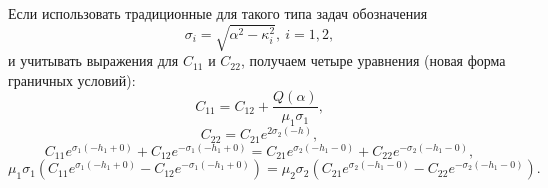 \documentclass[a4paper, 12pt]{article}
\newcommand{\s}[1]{\sigma_{#1}}
\newcommand{\m}[1]{\mu_{#1}}
\newcommand{\E}[2]{e^{#1 #2}}
\begin{document}
Если использовать традиционные для такого типа задач обозначения
$$\sigma_i=\sqrt{\alpha^2-\kappa_i^2},\ i=1, 2,$$
и учитывать выражения для $C_{11}$ и $C_{22}$, получаем четыре уравнения (новая форма граничных условий):
\begin{equation}
    C_{11}=C_{12}+\frac{Q(\alpha)}{\m{1} \s{1}},
\end{equation}
\begin{equation}
    C_{22}=C_{21} \E{2\s{2}}{(-h)},
\end{equation}
\begin{equation}
    C_{11} \E{\s{1}}{(-h_1+0)}+ C_{12} \E{-\s{1}}{(-h_1+0)}=C_{21} \E{\s{2}}{(-h_1-0)}+ C_{22} \E{-\s{2}}{(-h_1-0)},
\end{equation}
\begin{equation}
    \m{1}\s{1}\left(C_{11} \E{\s{1}}{(-h_1+0)}- C_{12} \E{-\s{1}}{(-h_1+0)}\right)=\m{2}\s{2}\left(C_{21} \E{\s{2}}{(-h_1-0)}- C_{22} \E{-\s{2}}{(-h_1-0)}\right).
\end{equation}
\end{document}
